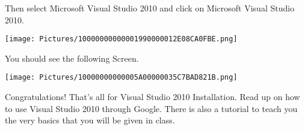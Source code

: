 \documentclass[
]{article}
\begin{document}
Then select Microsoft Visual Studio 2010 and click on Microsoft Visual
Studio 2010.

\texttt{[image: Pictures/10000000000001990000012E08CA0FBE.png]}

You should see the following Screen.

\texttt{[image: Pictures/10000000000005A00000035C7BAD821B.png]}

Congratulations! That's all for Visual Studio 2010 Installation. Read up
on how to use Visual Studio 2010 through Google. There is also a
tutorial to teach you the very basics that you will be given in class.
\end{document}
